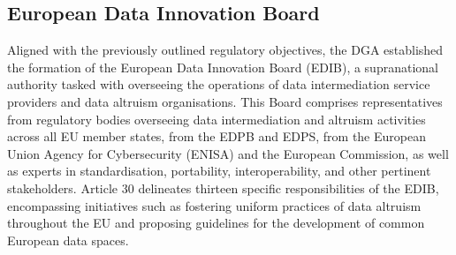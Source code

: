 \subsection{European Data Innovation Board}
\label{sec:edib}

Aligned with the previously outlined regulatory objectives, the DGA established the formation of the European Data Innovation Board (EDIB), a supranational authority tasked with overseeing the operations of data intermediation service providers and data altruism organisations.
This Board comprises representatives from regulatory bodies overseeing data intermediation and altruism activities across all EU member states, from the EDPB and EDPS, from the European Union Agency for Cybersecurity (ENISA) and the European Commission, as well as experts in standardisation, portability, interoperability, and other pertinent stakeholders.
Article 30 \citeyearpar{noauthor_regulation_2022} delineates thirteen specific responsibilities of the EDIB, encompassing initiatives such as fostering uniform practices of data altruism throughout the EU and proposing guidelines for the development of common European data spaces.

